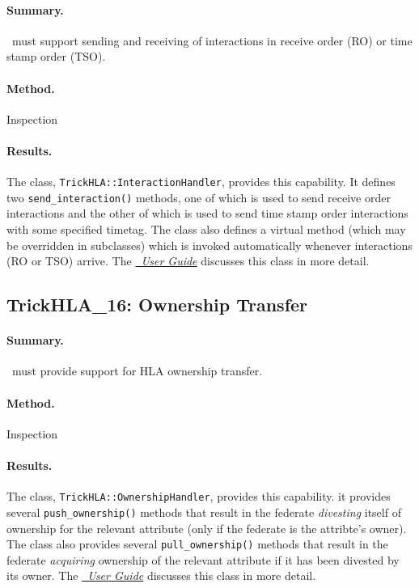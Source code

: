 \paragraph{Summary.}
\TrickHLA\ must support sending and receiving of interactions in
receive order (RO) or time stamp order (TSO).
\paragraph{Method.} Inspection
\paragraph{Results.}
The class, {\tt TrickHLA::InteractionHandler}, provides this capability.
It defines two {\tt send\_interaction()} methods, one of which is used to send receive
order interactions and the other of which is used to send time stamp order
interactions with some specified timetag.
The class also defines a virtual method (which may be overridden in
subclasses) which is invoked automatically whenever interactions
(RO or TSO) arrive.
The \href{file:TrickHLAUser.pdf} {\em \TrickHLA\ User Guide}
discusses this class in more detail.

\subsection{TrickHLA\_16: Ownership Transfer}
\paragraph{Summary.}
\TrickHLA\ must provide support for HLA ownership transfer.
\paragraph{Method.} Inspection
\paragraph{Results.}
The class, {\tt TrickHLA::OwnershipHandler}, provides this capability.
it provides several {\tt push\_ownership()} methods
that result in the federate {\em divesting} itself of ownership
for the relevant attribute (only if the federate is the attribte's owner).
The class also provides several {\tt pull\_ownership()} methods
that result in the federate {\em acquiring} ownership of the relevant
attribute if it has been divested by its owner.
The \href{file:TrickHLAUser.pdf} {\em \TrickHLA\ User Guide}
discusses this class in more detail.

